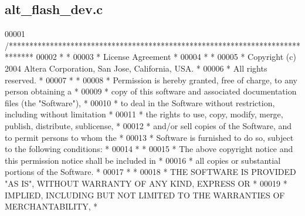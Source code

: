 \subsection{alt\+\_\+flash\+\_\+dev.\+c}
\label{alt__flash__dev_8c_source}

\begin{DoxyCode}
00001 \textcolor{comment}{/******************************************************************************}
00002 \textcolor{comment}{*                                                                             *}
00003 \textcolor{comment}{* License Agreement                                                           *}
00004 \textcolor{comment}{*                                                                             *}
00005 \textcolor{comment}{* Copyright (c) 2004 Altera Corporation, San Jose, California, USA.           *}
00006 \textcolor{comment}{* All rights reserved.                                                        *}
00007 \textcolor{comment}{*                                                                             *}
00008 \textcolor{comment}{* Permission is hereby granted, free of charge, to any person obtaining a     *}
00009 \textcolor{comment}{* copy of this software and associated documentation files (the "Software"),  *}
00010 \textcolor{comment}{* to deal in the Software without restriction, including without limitation   *}
00011 \textcolor{comment}{* the rights to use, copy, modify, merge, publish, distribute, sublicense,    *}
00012 \textcolor{comment}{* and/or sell copies of the Software, and to permit persons to whom the       *}
00013 \textcolor{comment}{* Software is furnished to do so, subject to the following conditions:        *}
00014 \textcolor{comment}{*                                                                             *}
00015 \textcolor{comment}{* The above copyright notice and this permission notice shall be included in  *}
00016 \textcolor{comment}{* all copies or substantial portions of the Software.                         *}
00017 \textcolor{comment}{*                                                                             *}
00018 \textcolor{comment}{* THE SOFTWARE IS PROVIDED "AS IS", WITHOUT WARRANTY OF ANY KIND, EXPRESS OR  *}
00019 \textcolor{comment}{* IMPLIED, INCLUDING BUT NOT LIMITED TO THE WARRANTIES OF MERCHANTABILITY,    *}

\end{DoxyCode}

